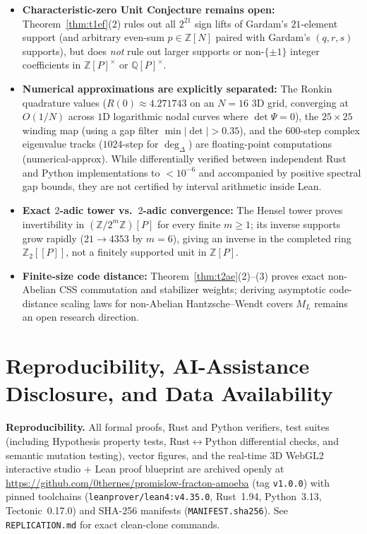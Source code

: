 \documentclass[11pt,reqno]{amsart}
\theoremstyle{definition}
\newcommand{\Z}{\mathbb{Z}}
\newcommand{\Q}{\mathbb{Q}}
\newcommand{\tierN}{\textsf{\scriptsize\textcolor{accentorange}{numerical-approx}}}
\begin{document}
\begin{itemize}[leftmargin=2em]
  \item \textbf{Characteristic-zero Unit Conjecture remains open:} Theorem~\ref{thm:t1ef}(2) rules
    out all $2^{21}$ sign lifts of Gardam's $21$-element support (and arbitrary even-sum
    $p \in \Z[N]$ paired with Gardam's $(q,r,s)$ supports), but does \emph{not} rule out larger
    supports or non-$\{\pm 1\}$ integer coefficients in $\Z[P]^\times$ or $\Q[P]^\times$.
  \item \textbf{Numerical approximations are explicitly separated:} The Ronkin quadrature values
    ($R(0) \approx 4.271743$ on an $N=16$ $3$D grid, converging at $O(1/N)$ across $1$D logarithmic
    nodal curves where $\det\Psi = 0$), the $25 \times 25$ winding map (using a gap filter
    $\min|\det| > 0.35$), and the $600$-step complex eigenvalue tracks ($1024$-step for
    $\deg_\Delta$) are floating-point computations (\tierN{}). While differentially verified between independent Rust and Python
    implementations to $< 10^{-6}$ and accompanied by positive spectral gap bounds, they are not
    certified by interval arithmetic inside Lean.
  \item \textbf{Exact $2$-adic tower vs.\ $2$-adic convergence:} The Hensel tower proves
    invertibility in $(\Z/2^m\Z)[P]$ for every finite $m \ge 1$; its inverse supports grow rapidly
    ($21 \to 4353$ by $m=6$), giving an inverse in the completed ring $\Z_2[[P]]$, not a finitely
    supported unit in $\Z[P]$.
  \item \textbf{Finite-size code distance:} Theorem~\ref{thm:t2ae}(2)--(3) proves exact non-Abelian
    CSS commutation and stabilizer weights; deriving asymptotic code-distance scaling laws for
    non-Abelian Hantzsche--Wendt covers $M_L$ remains an open research direction.
\end{itemize}

\section{Reproducibility, AI-Assistance Disclosure, and Data Availability}
\label{sec:repro}

\textbf{Reproducibility.} All formal proofs, Rust and Python verifiers, test suites (including
Hypothesis property tests, Rust$\leftrightarrow$Python differential checks, and semantic mutation
testing), vector figures, and the real-time $3$D WebGL2 interactive studio + Lean proof blueprint
are archived openly at \url{https://github.com/0thernes/promislow-fracton-amoeba} (tag \texttt{v1.0.0})
with pinned toolchains (\texttt{leanprover/lean4:v4.35.0}, Rust~1.94, Python~3.13, Tectonic~0.17.0)
and SHA-256 manifests (\texttt{MANIFEST.sha256}). See \texttt{REPLICATION.md} for exact clean-clone
commands.
\end{document}
